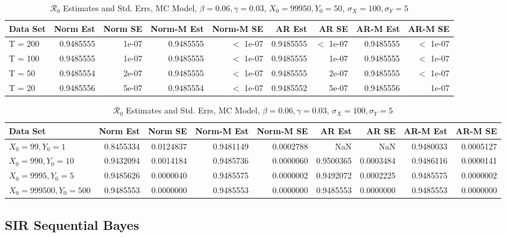 \documentclass[12pt]{article}
\newcommand{\rr}{\ensuremath{\mathcal{R}_0}}
\begin{document}
\begin{table}[H]
	
	\caption{\label{tab:}$\rr$ Estimates and Std. Errs, MC Model,
		$\beta = 0.06, \gamma = 0.03$, $X_0 = 99950, Y_0 = 50$, $\sigma_X = 100, \sigma_Y = 5$}
	\centering
	\begin{tabular}[t]{l|r|r|r|r|r|r|r|r}
		\hline
		Data Set & Norm Est & Norm SE & Norm-M Est & Norm-M SE & AR Est & AR SE & AR-M Est & AR-M SE\\
		\hline
		T = 200 & 0.9485555 & 1e-07 & 0.9485555 & $<$ 1e-07 & 0.9485555 & $<$ 1e-07 & 0.9485555 & $<$ 1e-07\\
		\hline
		T = 100 & 0.9485555 & 1e-07 & 0.9485555 & $<$ 1e-07 & 0.9485555 & 1e-07 & 0.9485555 & $<$ 1e-07\\
		\hline
		T = 50 & 0.9485554 & 2e-07 & 0.9485555 & $<$ 1e-07 & 0.9485555 & 2e-07 & 0.9485555 & $<$ 1e-07\\
		\hline
		T = 20 & 0.9485556 & 5e-07 & 0.9485554 & $<$ 1e-07 & 0.9485552 & 5e-07 & 0.9485556 & 1e-07\\
		\hline
	\end{tabular}
\end{table}

\begin{table}[H]
	
	\caption{\label{tab:}$\rr$ Estimates and Std. Errs, MC Model,
		$\beta = 0.06, \gamma = 0.03$, $\sigma_X = 100, \sigma_Y = 5$}
	\centering
	\begin{tabular}[t]{l|r|r|r|r|r|r|r|r}
		\hline
		Data Set & Norm Est & Norm SE & Norm-M Est & Norm-M SE & AR Est & AR SE & AR-M Est & AR-M SE\\
		\hline
		$X_0 = 99, Y_0 = 1$ & 0.8455334 & 0.0124837 & 0.9481149 & 0.0002788 & NaN & NaN & 0.9480033 & 0.0005127\\
		\hline
		$X_0 = 990, Y_0 = 10$ & 0.9432094 & 0.0014184 & 0.9485736 & 0.0000060 & 0.9500365 & 0.0003484 & 0.9486116 & 0.0000141\\
		\hline
		$X_0 = 9995, Y_0 = 5$ & 0.9485626 & 0.0000040 & 0.9485575 & 0.0000002 & 0.9492072 & 0.0002225 & 0.9485575 & 0.0000002\\
		\hline
		$X_0 = 999500, Y_0 = 500$ & 0.9485553 & 0.0000000 & 0.9485553 & 0.0000000 & 0.9485553 & 0.0000000 & 0.9485553 & 0.0000000\\
		\hline
	\end{tabular}
\end{table}

\subsection{SIR Sequential Bayes}
\end{document}
